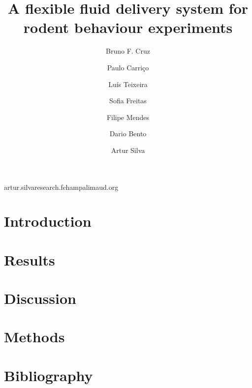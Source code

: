 
\title{A flexible fluid delivery system for rodent behaviour experiments}
\shorttitle{}

\author[1,2,3]{Bruno F. Cruz}
\author[1]{Paulo Carriço}
\author[1]{Luís Teixeira}
\author[1]{Sofia Freitas}
\author[1]{Filipe Mendes}
\author[1]{Dario Bento}
\author[1,\Letter]{Artur Silva}
\date{}

\maketitle

\begin{abstract}


\end{abstract}


\begin{corrauthor}
artur.silva\at research.fchampalimaud.org
\end{corrauthor}

\section*{Introduction}\label{s:introduction}


\section*{Results}\label{s:results}


\section*{Discussion}\label{s:discussion}


\section*{Methods}\label{s:methods}


\section*{Bibliography}



